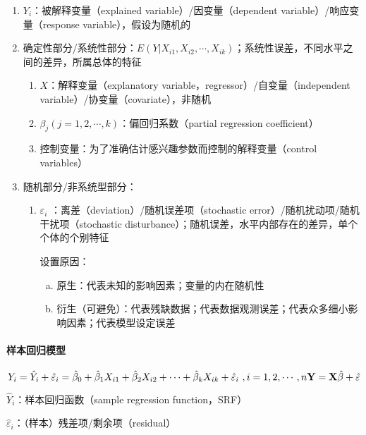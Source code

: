 \documentclass[12pt]{book}
\begin{document}
\begin{enumerate}[1.]
    \item $Y_i$：被解释变量（explained variable）/因变量（dependent variable）/响应变量（response variable），假设为随机的
    \item 确定性部分/系统性部分：$E(Y|X_{i1},X_{i2},\cdots,X_{ik})$；系统性误差，不同水平之间的差异，所属总体的特征
    \begin{enumerate}[(1)]
        \item $X$：解释变量（explanatory variable，regressor）/自变量（independent variable）/协变量（covariate），非随机
        \item $\beta_j(j=1,2,⋯,k)$：偏回归系数（partial regression coefficient） 
        \item 控制变量：为了准确估计感兴趣参数而控制的解释变量（control variables）
    \end{enumerate}
    \item 随机部分/非系统型部分：
    \begin{enumerate}[(1)]
        \item $\varepsilon_i$ ：离差（deviation）/随机误差项（stochastic error）/随机扰动项/随机干扰项（stochastic disturbance）；随机误差，水平内部存在的差异，单个个体的个别特征
        \par 设置原因：
    \begin{enumerate}[a.] 
        \item 原生：代表未知的影响因素；变量的内在随机性  
        \item 衍生（可避免）：代表残缺数据；代表数据观测误差；代表众多细小影响因素；代表模型设定误差
    \end{enumerate}
    \end{enumerate}
\end{enumerate}




\paragraph{样本回归模型}

$$
Y_i  ={\hat{Y}}_i+{\hat{\varepsilon}}_i \\ 
={\hat{\beta}}_0+{\hat{\beta}}_1X_{i1}+{\hat{\beta}}_2X_{i2}+\cdots+{\hat{\beta}}_kX_{ik}+{\hat{\varepsilon}}_i\ , i=1,2,\cdots,n \\  
\mathbf{Y}=\mathbf{X}\hat{\mathbf{\beta}}+\hat{\mathbf{\varepsilon}}
$$

\par ${\hat{Y}}_i$：样本回归函数（sample regression function，SRF）
\par ${\hat{\varepsilon}}_i$：（样本）残差项/剩余项（residual）
\end{document}
